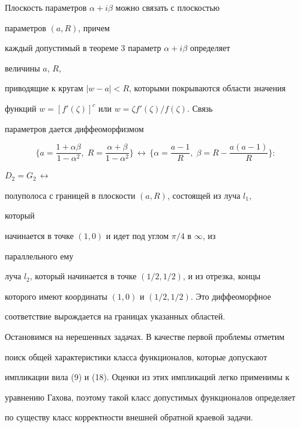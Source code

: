 \begin{note}


Плоскость параметров $\alpha+i\beta$ можно связать с плоскостью


параметров $(a,R)$, причем


каждый допустимый в теореме 3 параметр $\alpha+i\beta$ определяет


величины $a$, $R$,


приводящие к кругам $|w-a|<R$, которыми покрываются области значения


функций $w=[f'(\zeta)]^c$ или $w=\zeta f'(\zeta)/f(\zeta)$. Связь


параметров дается диффеоморфизмом


$$


\biggl\{a=\frac{1+\alpha\beta}{1-\alpha^2},\;


R=\frac{\alpha+\beta}{1-\alpha^2}\biggr\}\,\longleftrightarrow\,


\biggl\{\alpha=\frac{a-1}{R},\;\beta=R-\frac{a(a-1)}{R}\biggr\}:


$$


$D_2=G_2\,\leftrightarrow\,$


полуполоса с границей в плоскости $(a,R)$, состоящей из луча $l_1$,


который


начинается в точке $(1,0)$ и идет под углом $\pi/4$ в $\infty$, из


параллельного ему


луча $l_2$, который начинается в точке $(1/2,1/2)$, и из отрезка, концы


которого имеют координаты $(1,0)$ и $(1/2,1/2)$. Это диффеоморфное


соответствие вырождается на границах указанных областей.


\end{note}





Остановимся на нерешенных задачах. В качестве первой проблемы отметим


поиск общей характеристики класса функционалов, которые допускают


импликации вила (9) и (18). Оценки из этих импликаций легко применимы к


уравнению Гахова, поэтому такой класс допустимых функционалов определяет


по существу класс корректности внешней обратной краевой задачи.





